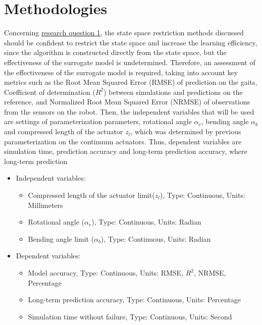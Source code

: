 \section{Methodologies}
Concerning \hyperref[rq1]{research question 1}, the state space restriction methods discussed should be confident to restrict the state space and increase the learning efficiency, since the algorithm is constructed directly from the state space, but the effectiveness of the surrogate model is undetermined. Therefore, an assessment of the effectiveness of the surrogate model is required, taking into account key metrics such as the Root Mean Squared Error (RMSE) of prediction on the gaits, Coefficient of determination ($R^2$) between simulations and predictions on the reference, and Normalized Root Mean Squared Error (NRMSE) of observations from the sensors on the robot. Then, the independent variables that will be used are settings of parameterization parameters, rotational angle $\alpha_r$, bending angle $\alpha_b$ and compressed length of the actuator $z_l$, which was determined by previous parameterization on the continuum actuators\cite{jiOmnidirectionalWalkingQuadruped2022}. Thus, dependent variables are simulation time, prediction accuracy and long-term prediction accuracy, where long-term prediction 
\begin{itemize}
    \item Independent variables: 
    \begin{itemize}
        \item Compressed length of the actuator limit($z_l$), Type: Continuous, Units: Millimeters
        \item Rotational angle ($\alpha_r$), Type: Continuous, Units: Radian
        \item Bending angle limit ($\alpha_b$), Type: Continuous, Units: Radian
    \end{itemize}
    \item Dependent variables:
    \begin{itemize}
        \item Model accuracy, Type: Continuous, Units: RMSE, $R^2$, NRMSE, Percentage
        \item Long-term prediction accuracy, Type: Continuous, Units: Percentage
        \item Simulation time without failure, Type: Continuous, Units: Second
    \end{itemize}
\end{itemize}


